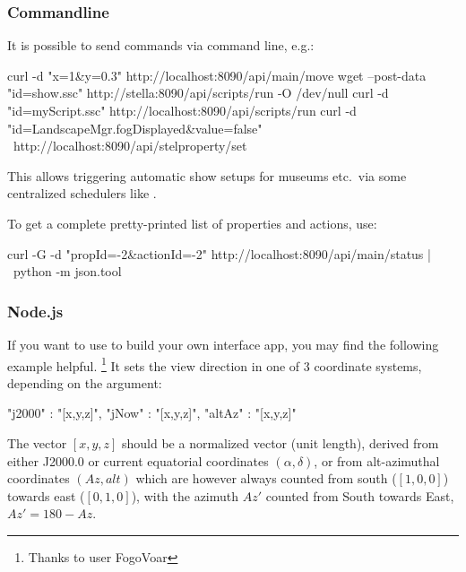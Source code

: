 \subsubsection{Commandline}
\label{sec:plugins:RemoteControl:API:CLI}

It is possible to send commands via command line, e.g.:

\begin{commandsScr}
curl -d "x=1&y=0.3" http://localhost:8090/api/main/move
wget --post-data "id=show.ssc" http://stella:8090/api/scripts/run -O /dev/null
curl -d "id=myScript.ssc" http://localhost:8090/api/scripts/run
curl -d "id=LandscapeMgr.fogDisplayed&value=false" \ 
      http://localhost:8090/api/stelproperty/set
\end{commandsScr}
This allows triggering automatic show setups for museums etc.\ via  some centralized schedulers like .

To get a complete pretty-printed list of properties and actions, use:
\begin{commandsScr}
curl -G -d "propId=-2&actionId=-2" http://localhost:8090/api/main/status | \
     python -m json.tool 
\end{commandsScr} 

\subsubsection{Node.js}
\label{sec:plugins:RemoteControl:API:node.js}

If you want to use  to build your own interface app, you may find the following example helpful.%
\footnote{Thanks to user FogoVoar}
It sets the view direction in one of 3 coordinate systems, depending on the argument:

\begin{commandsScr}
    "j2000" : "[x,y,z]",
    "jNow"  : "[x,y,z]",
    "altAz" : "[x,y,z]"
\end{commandsScr}

\noindent The vector $[x, y, z]$ should be a normalized vector (unit length), derived from 
either J2000.0 or current equatorial coordinates $(\alpha, \delta)$, 
or from alt-azimuthal coordinates $(\mathit{Az}, \mathit{alt})$ which are however always counted from south ($[1,0,0]$) towards east ($[0,1,0]$), 
with the azimuth $\mathit{Az}'$ counted from South towards East, $\mathit{Az}'=180-\mathit{Az}$.

